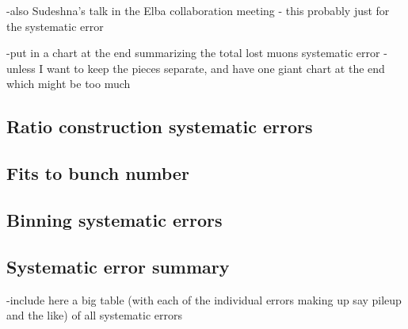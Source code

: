 -also Sudeshna's talk in the Elba collaboration meeting - this probably just for the systematic error






-put in a chart at the end summarizing the total lost muons systematic error - unless I want to keep the pieces separate, and have one giant chart at the end which might be too much



\subsection{Ratio construction systematic errors}
\label{sub:TimeShiftingParameters}



\subsection{Fits to bunch number}


\subsection{Binning systematic errors}



\subsection{Systematic error summary}

-include here a big table (with each of the individual errors making up say pileup and the like) of all systematic errors



\cleardoublepage






